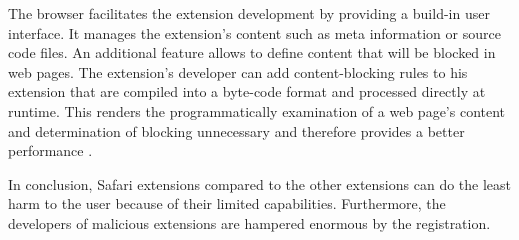 	The browser facilitates the extension development by providing a build-in user interface. It manages the extension's content such as meta information or source code files.	An additional feature allows to define content that will be blocked in web pages. The extension's developer can add content-blocking rules to his extension that are compiled into a byte-code format and processed directly at runtime. This renders the programmatically examination of a web page's content and determination of blocking unnecessary and therefore provides a better performance \cite{safariContentBlockingRules}.
	
	In conclusion, Safari extensions compared to the other extensions can do the least harm to the user because of their limited capabilities. Furthermore, the developers of malicious extensions are hampered enormous by the registration. 